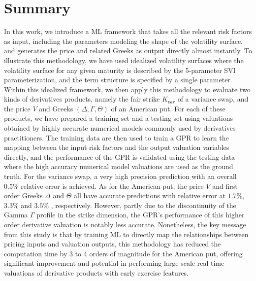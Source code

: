 \documentclass[%
 reprint,
 superscriptaddress,
nobibnotes,
 amsmath,amssymb,
 aps,
]{revtex4-2}
\begin{document}
\section{Summary}
\label{sec:summary}
In this work, we introduce a ML framework that takes all the relevant risk factors as input, including the parameters modeling the shape of the volatility surface, and generates the price and related Greeks as output directly almost instantly. To illustrate this methodology, we have used idealized volatility surfaces where the volatility surface for any given maturity is described by the  5-parameter SVI parameterization, and the term structure is specified by a single parameter. Within this idealized framework, we then apply this methodology to evaluate two kinds of derivatives products, namely the fair strike $K_{var}$ of a variance swap, and the price $V$ and Greeks $(\Delta,\Gamma,\Theta)$ of an American put. For each of these products, we have prepared a training set and a testing set using valuations obtained by highly accurate numerical models commonly used by derivatives practitioners. The training data are then used to train a GPR to learn the mapping between the input risk factors and the output valuation variables directly, and the performance of the GPR is validated using the testing data where the high accuracy numerical model valuations are used as the ground truth. For the variance swap, a very high precision prediction with an overall $0.5\%$ relative error is achieved. As for the American put, the price $V$ and first order Greeks $\Delta$ and $\Theta$ all have accurate predictions with relative error at $1.7\%$, $3.3\%$ and $3.5\%$ , respectively. However, partly due to the discontinuity of the Gamma $\Gamma$ profile in the strike dimension, the GPR's performance of this higher order derivative valuation  is notably less accurate. Nonetheless, the key message from this study is that by training ML to directly map the relationships between pricing inputs and valuation outputs, this methodology has reduced the computation time by 3 to 4 orders of magnitude for the American put, offering significant improvement and potential in performing large scale real-time valuations of derivative products with early exercise features.
\end{document}
